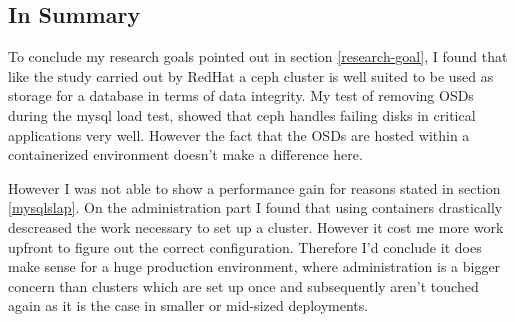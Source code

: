 \documentclass[titlepage, a4paper, 11pt]{scrartcl}
\begin{document}
        \subsection{In Summary}

        To conclude my research goals pointed out in section \ref*{research-goal}, I found that like the study carried out by RedHat\cite{redhatstudy} a ceph cluster is well suited to be used as storage for a database in terms of data integrity. My test of removing OSDs during the mysql load test, showed that ceph handles failing disks in critical applications very well. However the fact that the OSDs are hosted within a containerized environment doesn't make a difference here. 
        
        However I was not able to show a performance gain for reasons stated in section \ref*{mysqlslap}.
        On the administration part I found that using containers drastically descreased the work  necessary to set up a cluster. However it cost me more work upfront to figure out the correct configuration. Therefore I'd conclude it does make sense for a huge production environment, where administration is a bigger concern than clusters which are set up once and subsequently aren't touched again as it is the case in smaller or mid-sized deployments.
      
            
    
\end{document}
